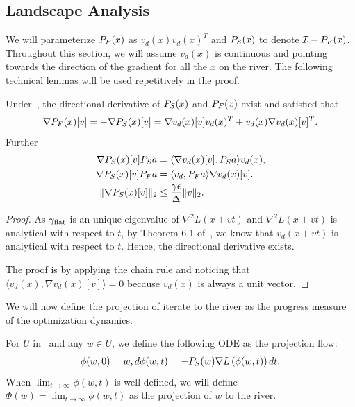 




\subsection{Landscape Analysis}
We will parameterize ${P}_F(x)$ as $v_d(x) v_d(x)^T$ and ${P}_S(x)$ to denote $\mathcal{I} - {P}_F(x)$. Throughout this section, we will assume $v_d(x)$ is continuous and pointing towards the direction of the gradient for all the $x$ on the river.
The following technical lemmas will be used repetitively in the proof.



\begin{lemma}
\label{lem:blockdiag}
Under~, the directional derivative of ${P}_S(x)$ and ${P}_F(x)$ exist and satisfied that 
\begin{align*}
    \nabla {P}_F(x)[v] = -\nabla {P}_S(x)[v] = \nabla v_d(x)[v] v_d(x)^T  + v_d(x) \nabla v_d(x)[v]^T.
\end{align*}
Further 
\begin{align*}
    \nabla {P}_S(x)[v] {P}_S a &= \langle \nabla v_d(x)[v], {P}_S a \rangle  v_d(x), \\
    \nabla {P}_S(x)[v] {P}_F a &= \langle v_d, {P}_F a \rangle  \nabla v_d(x)[v]. \\
    \| \nabla {P}_S(x)[v] \|_2 &\le \frac{\gamma \epsilon}{\Delta} \|v\|_2.
\end{align*}
\end{lemma}
\begin{proof}

    As $\gamma_{\mathrm{flat}}$ is an unique eigenvalue of $\nabla^2 L(x + vt)$ and $\nabla^2 L(x + vt)$ is analytical with respect to $t$, by Theorem 6.1 of~\cite{kato1995perturbation}, we know that $v_d(x + vt)$ is analytical with respect to $t$. Hence, the directional derivative exists.


    The proof is by applying the chain rule and noticing that $\langle v_d(x), \nabla v_d(x)[v] \rangle = 0$ because $v_d(x)$ is always a unit vector.
\end{proof}

We will now define the projection of iterate to the river as the progress measure of the optimization dynamics.
\begin{definition}
\label{def:project}
For $U$ in~ and any $w \in U$, we define the following ODE as the projection flow:
\begin{align}
\label{eq:projection}
    \phi(w, 0) = w, d \phi(w, t) = -{P}_S(w) \nabla L\left( \phi(w, t)\right) dt.
\end{align}
When $\lim_{t \to \infty} \phi(w, t)$ is well defined, we will define $\Phi(w) = \lim_{t \to \infty} \phi(w, t)$ as the projection of $w$ to the river.
\end{definition}


